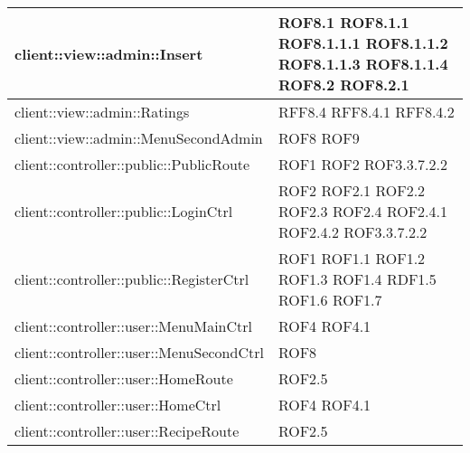 \begin{center}
\begin{longtable}{| p{11cm} | p{2.5cm} |}
\hline
client::view::admin::Insert & ROF8.1 \newline ROF8.1.1 \newline ROF8.1.1.1 \newline ROF8.1.1.2 \newline ROF8.1.1.3 \newline ROF8.1.1.4 \newline ROF8.2 \newline ROF8.2.1 \\
\hline
client::view::admin::Ratings & RFF8.4 \newline RFF8.4.1 \newline RFF8.4.2 \\
\hline
client::view::admin::MenuSecondAdmin & ROF8 \newline ROF9 \\
\hline
client::controller::public::PublicRoute & ROF1 \newline ROF2 \newline ROF3.3.7.2.2 \\
\hline
client::controller::public::LoginCtrl & ROF2 \newline ROF2.1 \newline ROF2.2 \newline ROF2.3 \newline ROF2.4 \newline ROF2.4.1 \newline ROF2.4.2 \newline ROF3.3.7.2.2 \\
\hline
client::controller::public::RegisterCtrl & ROF1 \newline ROF1.1 \newline ROF1.2 \newline ROF1.3 \newline ROF1.4 \newline RDF1.5 \newline ROF1.6 \newline ROF1.7 \\
\hline
client::controller::user::MenuMainCtrl & ROF4 \newline ROF4.1 \\
\hline
client::controller::user::MenuSecondCtrl & ROF8 \\
\hline
client::controller::user::HomeRoute & ROF2.5 \\
\hline
client::controller::user::HomeCtrl & ROF4 \newline ROF4.1 \\
\hline
client::controller::user::RecipeRoute & ROF2.5 \\

\end{longtable}
\end{center}
